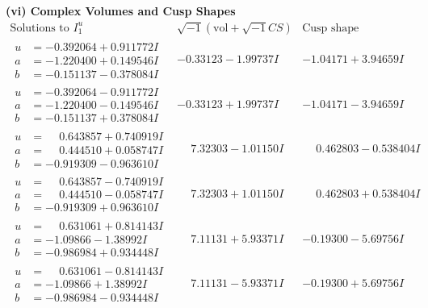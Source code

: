 \documentclass[1p]{elsarticle_modified}
\theoremstyle{definition}
\newcommand{\I}{\sqrt{-1}}
\begin{document}
\newpage\flushleft \textbf{(vi) Complex Volumes and Cusp Shapes}
$$\begin{array}{c|c|c}  
\text{Solutions to }I^u_{1}& \I (\text{vol} + \sqrt{-1}CS) & \text{Cusp shape}\\
 \hline 
\begin{aligned}
u &= -0.392064 + 0.911772 I \\
a &= -1.220400 + 0.149546 I \\
b &= -0.151137 - 0.378084 I\end{aligned}
 & -0.33123 - 1.99737 I & -1.04171 + 3.94659 I \\ \hline\begin{aligned}
u &= -0.392064 - 0.911772 I \\
a &= -1.220400 - 0.149546 I \\
b &= -0.151137 + 0.378084 I\end{aligned}
 & -0.33123 + 1.99737 I & -1.04171 - 3.94659 I \\ \hline\begin{aligned}
u &= \phantom{-}0.643857 + 0.740919 I \\
a &= \phantom{-}0.444510 + 0.058747 I \\
b &= -0.919309 - 0.963610 I\end{aligned}
 & \phantom{-}7.32303 - 1.01150 I & \phantom{-}0.462803 - 0.538404 I \\ \hline\begin{aligned}
u &= \phantom{-}0.643857 - 0.740919 I \\
a &= \phantom{-}0.444510 - 0.058747 I \\
b &= -0.919309 + 0.963610 I\end{aligned}
 & \phantom{-}7.32303 + 1.01150 I & \phantom{-}0.462803 + 0.538404 I \\ \hline\begin{aligned}
u &= \phantom{-}0.631061 + 0.814143 I \\
a &= -1.09866 - 1.38992 I \\
b &= -0.986984 + 0.934448 I\end{aligned}
 & \phantom{-}7.11131 + 5.93371 I & -0.19300 - 5.69756 I \\ \hline\begin{aligned}
u &= \phantom{-}0.631061 - 0.814143 I \\
a &= -1.09866 + 1.38992 I \\
b &= -0.986984 - 0.934448 I\end{aligned}
 & \phantom{-}7.11131 - 5.93371 I & -0.19300 + 5.69756 I \\ \hline\begin{aligned}

\end{aligned}
\end{array}$$
\end{document}
